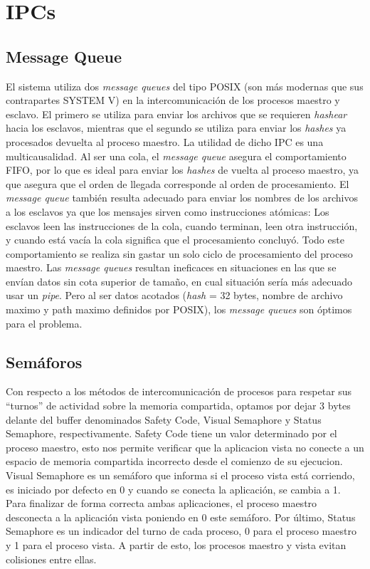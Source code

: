 \documentclass[10pt,a4paper]{report}
\begin{document}
\section{IPCs}
\subsection{Message Queue}
	El sistema utiliza dos \textit{message queues} del tipo POSIX (son más modernas que sus contrapartes SYSTEM V) en la intercomunicación de los procesos maestro y esclavo. El primero se utiliza para enviar los archivos que se requieren \textit{hashear} hacia los esclavos, mientras que el segundo se utiliza para enviar los \textit{hashes} ya procesados devuelta al proceso maestro. La utilidad de dicho IPC es una multicausalidad. Al ser una cola, el \textit{message queue} asegura el comportamiento FIFO, por lo que es ideal para enviar los \textit{hashes} de vuelta al proceso maestro, ya que asegura que el orden de llegada corresponde al orden de procesamiento. El \textit{message queue} también resulta adecuado para enviar los nombres de los archivos a los esclavos ya que los mensajes sirven como instrucciones atómicas: Los esclavos leen las instrucciones de la cola, cuando terminan, leen otra instrucción, y cuando está vacía la cola significa que el procesamiento concluyó. Todo este comportamiento se realiza sin gastar un solo ciclo de procesamiento del proceso maestro. Las \textit{message queues} resultan ineficaces en situaciones en las que se envían datos sin cota superior de tamaño, en cual situación sería más adecuado usar un \textit{pipe}. Pero al ser datos acotados (\textit{hash} = 32 bytes, nombre de archivo maximo y path maximo definidos por POSIX), los \textit{message queues} son óptimos para el problema. 
\subsection{Semáforos} 
Con respecto a los métodos de intercomunicación de procesos para respetar sus “turnos” de actividad sobre la memoria compartida, optamos por dejar 3 bytes delante del buffer denominados Safety Code, Visual Semaphore y Status Semaphore, respectivamente. 
Safety Code tiene un valor determinado por el proceso maestro, esto nos permite verificar que la aplicacion vista no conecte a un espacio de memoria compartida incorrecto desde el comienzo de su ejecucion. 
Visual Semaphore es un semáforo que informa si el proceso vista está corriendo, es iniciado por defecto en 0 y cuando se conecta la aplicación, se cambia a 1. Para finalizar de forma correcta ambas aplicaciones, el proceso maestro desconecta a la aplicación vista poniendo en 0 este semáforo.
Por último, Status Semaphore es un indicador del turno de cada proceso, 0 para el proceso maestro y 1 para el proceso vista. A partir de esto, los procesos maestro y vista evitan colisiones entre ellas. 
\end{document}
